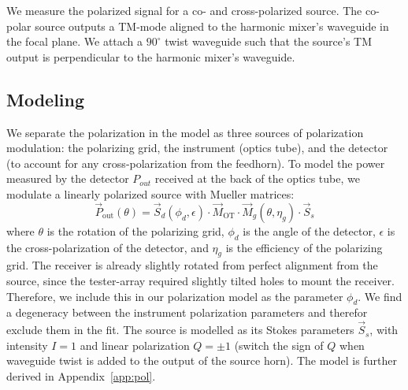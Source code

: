We measure the polarized signal for a co- and cross-polarized source.  The co-polar source outputs a TM-mode aligned to the harmonic mixer's waveguide in the focal plane.  We attach a $90^{\circ}$ twist waveguide such that the source's TM output is perpendicular to the harmonic mixer's waveguide.

\subsection{Modeling}
We separate the polarization in the model as three sources of polarization modulation: the polarizing grid, the instrument (optics tube), and the detector (to account for any cross-polarization from the feedhorn).  To model the power measured by the detector $P_{out}$ received at the back of the optics tube, we modulate a linearly polarized source with Mueller matrices:
\begin{equation}
    \vec{P}_{\text{out}}(\theta) = \vec{S}_{d}(\phi_{d},\epsilon)\cdot \vec{M}_{\text{OT}}\cdot \vec{M}_{g}(\theta,\eta_{g})\cdot \vec{S}_{s}
\end{equation}
where $\theta$ is the rotation of the polarizing grid, $\phi_d$ is the angle of the detector, $\epsilon$ is the cross-polarization of the detector, and $\eta_g$ is the efficiency of the polarizing grid.  The receiver is already slightly rotated from perfect alignment from the source, since the tester-array required slightly tilted holes to mount the receiver.  Therefore, we include this in our polarization model as the parameter $\phi_d$.  We find a degeneracy between the instrument polarization parameters and therefor exclude them in the fit.  The source is modelled as its Stokes parameters $\vec{S}_{s}$, with intensity $I=1$ and linear polarization $Q=\pm 1$ (switch the sign of $Q$ when waveguide twist is added to the output of the source horn).  The model is further derived in Appendix~\ref{app:pol}.  

